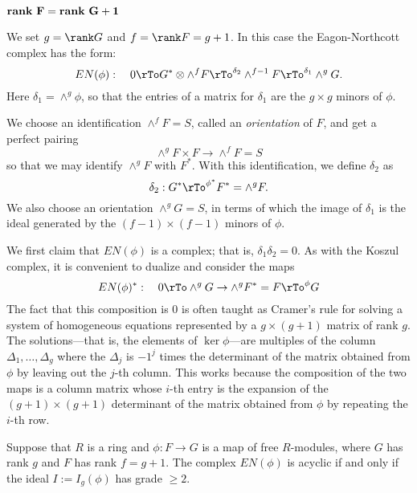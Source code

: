 \subsubsection{ $\mathbf{{\bf rank\ } F = {\bf rank\ }G + 1}$}

We set $g=\rank G$ and $f = \rank F = g+1$. In this case the Eagon-Northcott complex has the form:
$$
EN(\phi):\quad 0\rTo G^{*}\otimes \wedge^{f}F \rTo^{\delta_{2}} \wedge^{f-1}F \rTo^{\delta_{1}} \wedge^gG.
$$
Here $\delta_{1} = \wedge^{g}\phi$, so that the entries of a matrix for $\delta_{1}$ are the $g\times g$ minors of 
$\phi$.

We choose an identification $\wedge^{f}F = S$, called an \emph{orientation} of $F$, and get a perfect pairing 
$$
\wedge^{g}F \times F \to \wedge^{f}F = S
$$
so that we may identify
 $\wedge^{g}F$ with $F^{*}$. With this identification, we define $\delta_{2}$ as
 $$
\delta_{2}:  G^{*}\rTo^{\phi^{*}}  F^{*} = \wedge^{g}F.
 $$
We also choose an orientation $\wedge^{g}G = S$, in terms of which the image of $\delta_{1}$ is
 the ideal generated by the $(f-1)\times (f-1)$  minors of $\phi$.
 
We first claim that $EN(\phi)$ is a complex; that is,  $\delta_{1}\delta_{2} = 0$.  As with the Koszul complex,
it is convenient to dualize and consider the maps 
$$
EN(\phi)^{*}:\quad 0\rTo \wedge^{g} G \to \wedge^{g}F^{*} = F \rTo^{\phi} G
$$
The fact that this composition is 0 is often taught as Cramer's rule for solving a system of
homogeneous equations represented by a $g\times (g+1)$ matrix of rank $g$.
The solutions---that is, the elements of $\ker \phi$---are multiples of the column
$\Delta_{1}, \dots, \Delta_{g}$ where the $\Delta_{j}$ is $-1^{j}$ times the determinant
of the matrix obtained from $\phi$ by leaving out the $j$-th column. This works
because the composition of the two maps is a column matrix whose $i$-th entry is the
expansion of the $(g+1)\times (g+1)$ determinant of the matrix obtained from $\phi$ by
repeating the $i$-th row.

\begin{theorem}\label{EN grade 2}
 Suppose that $R$ is a ring and $\phi: F\to G$ is a map of  free $R$-modules, 
 where $G$ has rank $g$ and $F$ has rank $f = g+1$.
 The complex $EN(\phi)$ is acyclic if and only if the ideal $I := I_{g}(\phi)$ has grade $\geq 2$.
 \end{theorem}


